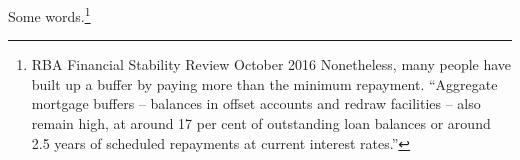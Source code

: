 \documentclass{article}
\begin{document}
Some words.\footnote{RBA Financial Stability Review October 2016 Nonetheless, many people have built up a buffer by paying more than the minimum repayment. ``Aggregate mortgage buffers – balances in offset accounts and redraw facilities -- also remain high, at around 17 per cent of outstanding loan balances or around 2.5 years of scheduled repayments at current interest rates.''} 
\end{document}
